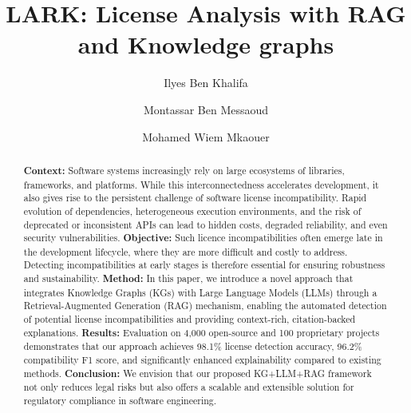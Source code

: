 \documentclass[review]{elsarticle}
\begin{document}





\begin{frontmatter}

\title{LARK: License Analysis with RAG and Knowledge graphs}


\author[TBS]{Ilyes Ben Khalifa}


\author[LAR]{Montassar Ben Messaoud}


\author[UoM]{Mohamed Wiem Mkaouer}




\address[LAR]{University of Tunis, LARODEC, Tunis Business School, El Mourouj, Tunisia}
\address[TBS]{University of Tunis, Tunis Business School, El Mourouj, Tunisia}
\address[UoM]{University of Michigan Flint, MI, USA}










\begin{abstract}


\noindent\textbf{Context:} Software systems increasingly rely on large ecosystems of libraries, frameworks, and platforms. While this interconnectedness accelerates development, it also gives rise to the persistent challenge of software license incompatibility. Rapid evolution of dependencies, heterogeneous execution environments, and the risk of deprecated or inconsistent APIs can lead to hidden costs, degraded reliability, and even security vulnerabilities. \noindent\textbf{Objective:} Such licence incompatibilities often emerge late in the development lifecycle, where they are more difficult and costly to address. Detecting incompatibilities at early stages is therefore essential for ensuring robustness and sustainability.
\noindent\textbf{Method:}  In this paper, we introduce a novel approach that integrates Knowledge Graphs (KGs) with Large Language Models (LLMs) through a Retrieval-Augmented Generation (RAG) mechanism, enabling the automated detection of potential license incompatibilities and providing context-rich, citation-backed explanations.
\noindent\textbf{Results:} Evaluation on 4,000 open-source and 100 proprietary projects demonstrates that our approach achieves 98.1\% license detection accuracy, 96.2\% compatibility F1 score, and significantly enhanced explainability compared to existing methods.
\noindent\textbf{Conclusion:}  We envision that our proposed KG+LLM+RAG framework not only reduces legal risks but also offers a scalable and extensible solution for regulatory compliance in software engineering.


\end{abstract}
\end{frontmatter}
\end{document}
